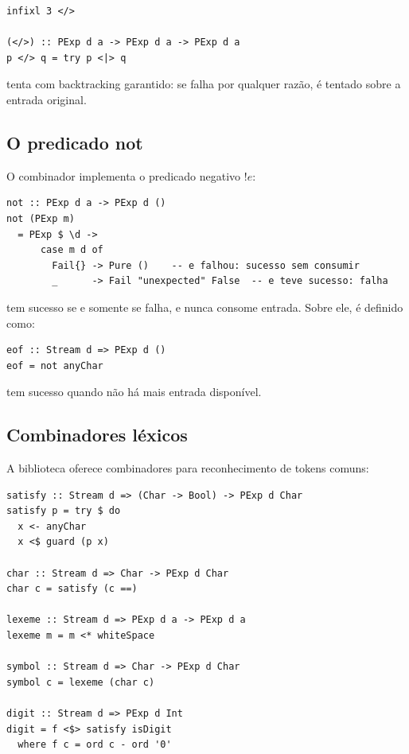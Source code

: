 \begin{verbatim}
infixl 3 </>

(</>) :: PExp d a -> PExp d a -> PExp d a
p </> q = try p <|> q
\end{verbatim}

 tenta 
com backtracking garantido: se  falha por
qualquer razão,  é tentado sobre a entrada original.

\subsection{O predicado not}

O combinador  implementa o predicado
negativo \(!e\):

\begin{verbatim}
not :: PExp d a -> PExp d ()
not (PExp m)
  = PExp $ \d ->
      case m d of
        Fail{} -> Pure ()    -- e falhou: sucesso sem consumir
        _      -> Fail "unexpected" False  -- e teve sucesso: falha
\end{verbatim}

 tem sucesso se e somente se
 falha, e nunca consome entrada. Sobre
ele,  é definido como:

\begin{verbatim}
eof :: Stream d => PExp d ()
eof = not anyChar
\end{verbatim}

 tem sucesso quando não há mais entrada disponível.

\subsection{Combinadores léxicos}

A biblioteca oferece combinadores para reconhecimento de tokens comuns:

\begin{verbatim}
satisfy :: Stream d => (Char -> Bool) -> PExp d Char
satisfy p = try $ do
  x <- anyChar
  x <$ guard (p x)

char :: Stream d => Char -> PExp d Char
char c = satisfy (c ==)

lexeme :: Stream d => PExp d a -> PExp d a
lexeme m = m <* whiteSpace

symbol :: Stream d => Char -> PExp d Char
symbol c = lexeme (char c)

digit :: Stream d => PExp d Int
digit = f <$> satisfy isDigit
  where f c = ord c - ord '0'
\end{verbatim}

